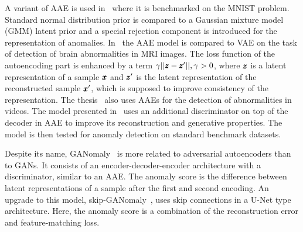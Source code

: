 A variant of AAE is used in~\cite{leveau2017adversarial} where it is benchmarked on the MNIST problem. Standard normal distribution prior is compared to a Gaussian mixture model (GMM) latent prior and a special rejection component is introduced for the representation of anomalies. In~\cite{chen2018unsupervised} the AAE model is compared to VAE on the task of detection of brain abnormalities in MRI images. The loss function of the autoencoding part is enhanced by a term $\gamma||\pmb{{z}}-\pmb{{z}}'||, \gamma > 0$, where $\pmb{{z}}$ is a latent representation of a sample $\pmb{{x}}$ and $\pmb{{z}}'$ is the latent representation of the reconstructed sample $\pmb{{x}}'$, which is supposed to improve consistency of the representation. The thesis~\cite{dimokranitou2017adversarial} also uses AAEs for the detection of abnormalities in videos. The model presented in~\cite{pidhorskyi2018generative} uses an additional discriminator on top of the decoder in AAE to improve its reconstruction and generative properties. The model is then tested for anomaly detection on standard benchmark datasets.

Despite its name, GANomaly~\cite{akcay2018ganomaly, ahnDeepGenerativeModelsBased2020} is more related to adversarial autoencoders than to GANs. It consists of an encoder-decoder-encoder architecture with a discriminator, similar to an AAE. The anomaly score is the difference between latent representations of a sample after the first and second encoding. An upgrade to this model, skip-GANomaly~\cite{akcay2019skip}, uses skip connections in a U-Net type architecture. Here, the anomaly score is a combination of the reconstruction error and feature-matching loss.

